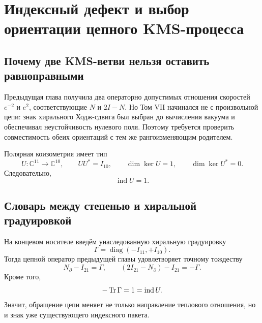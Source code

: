 \chapter{Индексный дефект и выбор ориентации цепного KMS-процесса}
\label{ch:v8-chain-orientation-index-defect-selector-gate}

\section{Почему две KMS-ветви нельзя оставить равноправными}

Предыдущая глава получила два операторно допустимых отношения скоростей
$e^{-2}$ и $e^2$, соответствующие $N$ и $2I-N$. Но Том VII начинался не с
произвольной цепи: знак хирального Ходж-сдвига был выбран до вычисления
вакуума и обеспечивал неустойчивость нулевого поля. Поэтому требуется
проверить совместимость обеих ориентаций с тем же рангоизменяющим
родителем.

Полярная коизометрия имеет тип
\begin{equation}
 U:\mathbb C^{11}\longrightarrow\mathbb C^{10},
 \qquad UU^*=I_{10},
 \qquad \dim\ker U=1,
 \qquad \dim\ker U^*=0.
\end{equation}
Следовательно,
\begin{equation}
 \operatorname{ind}U=1.
 \label{eq:v8-polar-fredholm-index}
\end{equation}

\section{Словарь между степенью и хиральной градуировкой}

На концевом носителе введём унаследованную хиральную градуировку
\begin{equation}
 \Gamma=\operatorname{diag}(-I_{11},+I_{10}).
 \label{eq:v8-endpoint-chiral-grading}
\end{equation}
Тогда цепной оператор предыдущей главы удовлетворяет точному тождеству
\begin{equation}
 N_{\partial}-I_{21}=\Gamma,
 \qquad
 (2I_{21}-N_{\partial})-I_{21}=-\Gamma.
 \label{eq:v8-chain-grading-dictionary}
\end{equation}
Кроме того,
\begin{equation}
 -\operatorname{Tr}\Gamma=1=\operatorname{ind}U.
 \label{eq:v8-index-grading-sign}
\end{equation}
Значит, обращение цепи меняет не только направление теплового отношения,
но и знак уже существующего индексного пакета.

